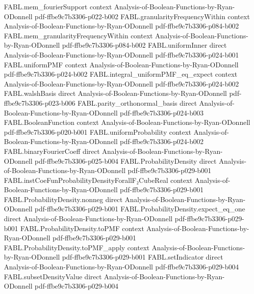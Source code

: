\begin{theorem}
\proofstep
  {FABL.mem_fourierSupport}
  {context}
  {Analysis-of-Boolean-Functions-by-Ryan-ODonnell}
  {pdf-ffbe9c7b3306-p022-b002}
\proofstep
  {FABL.granularityFrequencyWithin}
  {context}
  {Analysis-of-Boolean-Functions-by-Ryan-ODonnell}
  {pdf-ffbe9c7b3306-p084-b002}
\proofstep
  {FABL.mem_granularityFrequencyWithin}
  {context}
  {Analysis-of-Boolean-Functions-by-Ryan-ODonnell}
  {pdf-ffbe9c7b3306-p084-b002}
\proofstep
  {FABL.uniformInner}
  {direct}
  {Analysis-of-Boolean-Functions-by-Ryan-ODonnell}
  {pdf-ffbe9c7b3306-p024-b001}
\proofstep
  {FABL.uniformPMF}
  {context}
  {Analysis-of-Boolean-Functions-by-Ryan-ODonnell}
  {pdf-ffbe9c7b3306-p024-b002}
\proofstep
  {FABL.integral_uniformPMF_eq_expect}
  {context}
  {Analysis-of-Boolean-Functions-by-Ryan-ODonnell}
  {pdf-ffbe9c7b3306-p024-b002}
\proofstep
  {FABL.walshBasis}
  {direct}
  {Analysis-of-Boolean-Functions-by-Ryan-ODonnell}
  {pdf-ffbe9c7b3306-p023-b006}
\proofstep
  {FABL.parity_orthonormal_basis}
  {direct}
  {Analysis-of-Boolean-Functions-by-Ryan-ODonnell}
  {pdf-ffbe9c7b3306-p024-b003}
\proofstep
  {FABL.BooleanFunction}
  {context}
  {Analysis-of-Boolean-Functions-by-Ryan-ODonnell}
  {pdf-ffbe9c7b3306-p020-b001}
\proofstep
  {FABL.uniformProbability}
  {context}
  {Analysis-of-Boolean-Functions-by-Ryan-ODonnell}
  {pdf-ffbe9c7b3306-p024-b002}
\proofstep
  {FABL.binaryFourierCoeff}
  {direct}
  {Analysis-of-Boolean-Functions-by-Ryan-ODonnell}
  {pdf-ffbe9c7b3306-p025-b004}
\proofstep
  {FABL.ProbabilityDensity}
  {direct}
  {Analysis-of-Boolean-Functions-by-Ryan-ODonnell}
  {pdf-ffbe9c7b3306-p029-b001}
\proofstep
  {FABL.instCoeFunProbabilityDensityForallF₂CubeReal}
  {context}
  {Analysis-of-Boolean-Functions-by-Ryan-ODonnell}
  {pdf-ffbe9c7b3306-p029-b001}
\proofstep
  {FABL.ProbabilityDensity.nonneg}
  {direct}
  {Analysis-of-Boolean-Functions-by-Ryan-ODonnell}
  {pdf-ffbe9c7b3306-p029-b001}
\proofstep
  {FABL.ProbabilityDensity.expect_eq_one}
  {direct}
  {Analysis-of-Boolean-Functions-by-Ryan-ODonnell}
  {pdf-ffbe9c7b3306-p029-b001}
\proofstep
  {FABL.ProbabilityDensity.toPMF}
  {context}
  {Analysis-of-Boolean-Functions-by-Ryan-ODonnell}
  {pdf-ffbe9c7b3306-p029-b001}
\proofstep
  {FABL.ProbabilityDensity.toPMF_apply}
  {context}
  {Analysis-of-Boolean-Functions-by-Ryan-ODonnell}
  {pdf-ffbe9c7b3306-p029-b001}
\proofstep
  {FABL.setIndicator}
  {direct}
  {Analysis-of-Boolean-Functions-by-Ryan-ODonnell}
  {pdf-ffbe9c7b3306-p029-b004}
\proofstep
  {FABL.subsetDensityValue}
  {direct}
  {Analysis-of-Boolean-Functions-by-Ryan-ODonnell}
  {pdf-ffbe9c7b3306-p029-b004}
\proofstep

\end{theorem}
